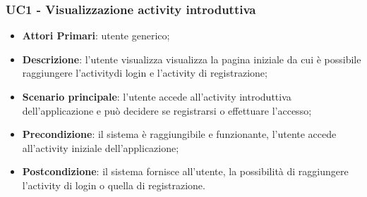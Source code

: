 
\subsubsection{UC1 - Visualizzazione activity introduttiva}
\begin{itemize}
	\item \textbf{Attori Primari}: utente generico;
	\item \textbf{Descrizione}: l'utente visualizza visualizza la pagina iniziale da cui è possibile raggiungere l'activity\glosp di login e l'activity di registrazione;
	\item \textbf{Scenario principale}: l'utente accede all'activity introduttiva dell'applicazione e può decidere se registrarsi o effettuare l'accesso;
	\item \textbf{Precondizione}: il sistema è raggiungibile e funzionante, l'utente accede all'activity iniziale dell'applicazione;
	\item \textbf{Postcondizione}: il sistema fornisce all'utente, la possibilità di raggiungere l'activity di login o quella di registrazione.
	
	
\end{itemize}
